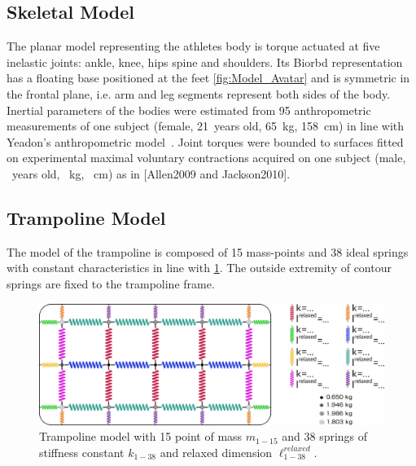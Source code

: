 \subsection{Skeletal Model}\label{subsec:2a}
The planar model representing the athletes body is torque actuated at five inelastic joints: ankle, knee, hips spine and shoulders.
Its Biorbd \cite{michaudBiorbd2021} representation has a floating base positioned at the feet \ref{fig:Model_Avatar} and is symmetric in the frontal plane, i.e. arm and leg segments represent both sides of the body.
Inertial parameters of the bodies were estimated from 95 anthropometric measurements of one subject (female, 21~years old, 65~kg, 158~cm) in line with Yeadon's anthropometric model~\cite{yeadon1990simulation}.
Joint torques were bounded to surfaces fitted on experimental maximal voluntary contractions acquired on one subject (male, ~years old, ~kg, ~cm)  as in [Allen2009 and Jackson2010].



\subsection{Trampoline Model}\label{subsec:2b}
The model of the trampoline is composed of 15 mass-points and 38 ideal springs with constant characteristics in line with \cite{jacques2008determining} \ref{fig:Model_Toile}.
The outside extremity of contour springs are fixed to the trampoline frame.


\begin{figure}[h!]
\centering
\includegraphics[width=\linewidth]{figures/Model_Toile.png}
\caption{Trampoline model with 15 point of mass $m_{1-15}$ and 38 springs of stiffness constant $k_{1-38}$ and relaxed dimension ${\ell}^{relaxed}_{1-38}$.}
\label{fig:Model_Toile}
\end{figure}


